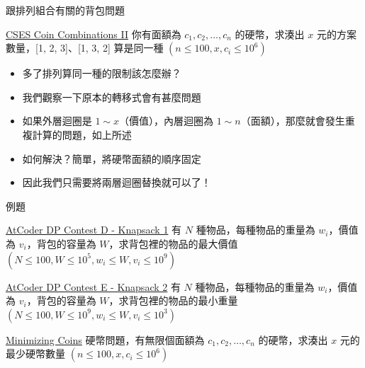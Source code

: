 \documentclass[aspectratio=169]{beamer}
\begin{document}
    \begin{frame}{跟排列組合有關的背包問題}
        \begin{block}{\href{https://cses.fi/problemset/task/1636}{CSES Coin Combinations II}}
            你有面額為 $c_1, c_2, \dots, c_n$ 的硬幣，求湊出 $x$ 元的方案數量，[1, 2, 3]、[1, 3, 2] 算是同一種 $(n \le 100, x, c_i \le 10^6)$
        \end{block}

        \begin{itemize}
            \item<1-> 多了排列算同一種的限制該怎麼辦？
            \item<2-> 我們觀察一下原本的轉移式會有甚麼問題
            \item<3-> 如果外層迴圈是 $1 \sim x$（價值），內層迴圈為 $1 \sim n$（面額），那麼就會發生重複計算的問題，如上所述
            \item<4-> 如何解決？簡單，將硬幣面額的順序固定
            \item<5-> 因此我們只需要將兩層迴圈替換就可以了！
        \end{itemize}
    \end{frame}

    \begin{frame}{例題}
        \begin{block}{\href{https://atcoder.jp/contests/dp/tasks/dp_d}{AtCoder DP Contest D - Knapsack 1}}
            有 $N$ 種物品，每種物品的重量為 $w_i$，價值為 $v_i$，背包的容量為 $W$，求背包裡的物品的最大價值\\
            $(N \le 100, W \le 10^5, w_i \le W, v_i \le 10^9)$
        \end{block}

        \begin{block}{\href{https://atcoder.jp/contests/dp/tasks/dp_e}{AtCoder DP Contest E - Knapsack 2}}
            有 $N$ 種物品，每種物品的重量為 $w_i$，價值為 $v_i$，背包的容量為 $W$，求背包裡的物品的最小重量\\
            $(N \le 100, W \le 10^9, w_i \le W, v_i \le 10^3)$  
        \end{block}

        \begin{block}{\href{https://cses.fi/problemset/task/1634}{Minimizing Coins}}
            硬幣問題，有無限個面額為 $c_1, c_2, \dots, c_n$ 的硬幣，求湊出 $x$ 元的最少硬幣數量 $(n \le 100, x, c_i \le 10^6)$
        \end{block}
    \end{frame}
\end{document}
